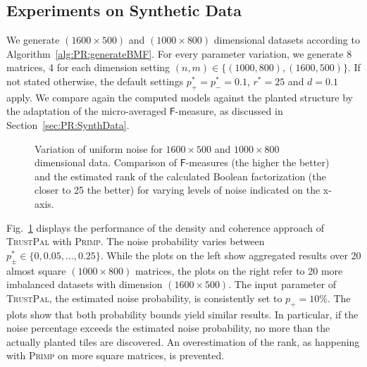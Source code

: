 \subsection{Experiments on Synthetic Data}
We generate $(1600\times 500)$ and $(1000\times 800)$ dimensional datasets according to Algorithm~\ref{alg:PR:generateBMF}. For every parameter variation, we generate 8 matrices, 4 for each dimension setting $(n,m)\in\{(1000,800),(1600,500)\}$. If not stated otherwise, the default settings $p_+^*=p_-^*=0.1$, $r^*=25$ and $d=0.1$ apply. 
We compare again the computed models against the planted structure by the adaptation of the micro-averaged $\mathsf{F}$-measure, as discussed in Section~\ref{sec:PR:SynthData}.
\begin{figure}[t]
\centering

\caption{Variation of uniform noise for $1600\times 500$ and $1000\times 800$ dimensional data. Comparison of $\mathsf{F}$-measures (the higher the better) and the estimated rank of the calculated Boolean factorization (the closer to 25 the better) for varying levels of noise indicated on the x-axis.}
\label{fig:TP:noise}
\end{figure}

Fig.~\ref{fig:TP:noise} displays the performance of the density and coherence approach of \textsc{TrustPal} with \textsc{Primp}. The noise probability varies between $p_\pm^*\in\{0,0.05,\ldots,0.25\}$. While the plots on the left show aggregated results over 20 almost square $(1000\times 800)$ matrices, the plots on the right refer to 20 more imbalanced datasets with dimension $(1600\times 500)$. The input parameter of \textsc{TrustPal}, the estimated noise probability, is consistently set to $p_+=10\%$. The plots show that both probability bounds yield similar results. In particular, if the noise percentage exceeds the estimated noise probability, no more than the actually planted tiles are discovered. An overestimation of the rank, as happening with \textsc{Primp} on more square matrices, is prevented. 

